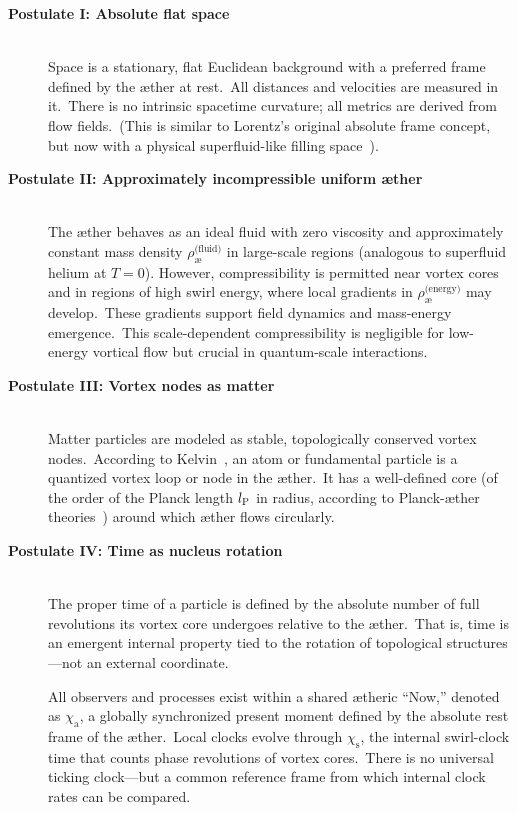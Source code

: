 \begin{description}
    \item[\textbf{Postulate I: Absolute flat space}] \hfill \\
    Space is a stationary, flat Euclidean background with a preferred frame defined by the æther at rest.\ All distances and velocities are measured in it.\ There is no intrinsic spacetime curvature; all metrics are derived from flow fields.\ (This is similar to Lorentz's original absolute frame concept, but now with a physical superfluid-like filling space~\cite{Winterberg2002-PlanckÆther}).

    \item[\textbf{Postulate II: Approximately incompressible uniform æther}] \hfill \\
    The æther behaves as an ideal fluid with zero viscosity and approximately constant mass density \textbf{$\rho^{\text{(fluid)}}_{\text{\ae}}$} in large-scale regions (analogous to superfluid helium at $T=0$). However, compressibility is permitted near vortex cores and in regions of high swirl energy, where local gradients in \textbf{$\rho^{\text{(energy)}}_{\text{\ae}}$} may develop.\ These gradients support field dynamics and mass-energy emergence.\ This scale-dependent compressibility is negligible for low-energy vortical flow but crucial in quantum-scale interactions.

    \item[\textbf{Postulate III: Vortex nodes as matter}] \hfill \\
    Matter particles are modeled as stable, topologically conserved vortex nodes.\ According to Kelvin~\cite{Kelvin1867-vortex}, an atom or fundamental particle is a quantized vortex loop or node in the æther.\ It has a well-defined core (of the order of the Planck length $l_{\textrm P}$ in radius, according to Planck-æther theories~\cite{Winterberg2002-PlanckÆther}) around which æther flows circularly.

    \item[\textbf{Postulate IV: Time as nucleus rotation}] \hfill \\
    The proper time of a particle is defined by the absolute number of full revolutions its vortex core undergoes relative to the æther.\ That is, time is an emergent internal property tied to the rotation of topological structures—not an external coordinate.

    All observers and processes exist within a shared ætheric “Now,” denoted as $\chi_{\mathrm{a}}$,  a globally synchronized present moment
    defined by the absolute rest frame of the æther.\  Local clocks evolve through $\chi_{\mathrm{s}}$, the internal swirl-clock time that counts phase revolutions of vortex cores.\ There is no  universal ticking clock—but a common reference frame from which internal clock rates can be compared.


\end{description}
